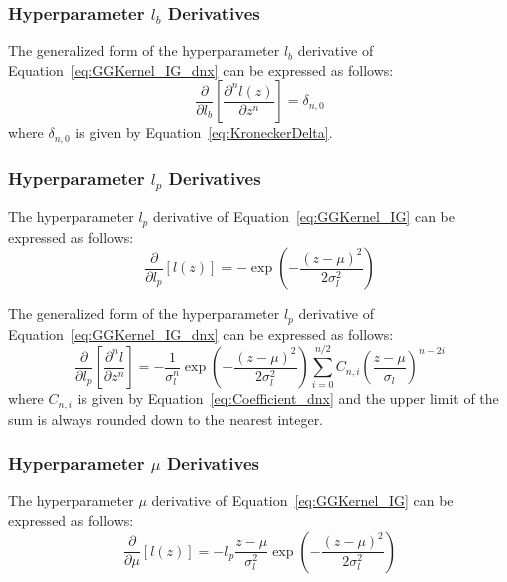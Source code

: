 \documentclass{article}
\begin{document}
\subsubsection{Hyperparameter $l_b$ Derivatives}
\label{subsubsec:GG_IGHypDer_lb}

The generalized form of the hyperparameter $l_b$ derivative of Equation~\eqref{eq:GGKernel_IG_dnx} can be expressed as follows:
\begin{equation}
\label{eq:GGKernel_IG_db_dnx}
	\frac{\partial}{\partial l_b} \left[\frac{\partial^n l\!\left(z\right)}{\partial z^n}\right] = \delta_{n,0}
\end{equation}
where $\delta_{n,0}$ is given by Equation~\eqref{eq:KroneckerDelta}.

\subsubsection{Hyperparameter $l_p$ Derivatives}
\label{subsubsec:GG_IGHypDer_lp}

The hyperparameter $l_p$ derivative of Equation~\eqref{eq:GGKernel_IG} can be expressed as follows:
\begin{equation}
\label{eq:GGKernel_IG_dp}
	\frac{\partial}{\partial l_p} \left[l\!\left(z\right)\right] = -\exp{\left(-\frac{\left(z - \mu\right)^2}{2 \sigma_l^2}\right)}
\end{equation}

The generalized form of the hyperparameter $l_p$ derivative of Equation~\eqref{eq:GGKernel_IG_dnx} can be expressed as follows:
\begin{equation}
\label{eq:GGKernel_IG_dp_dnx}
	\frac{\partial}{\partial l_p} \left[\frac{\partial^n l}{\partial z^n}\right] = - \frac{1}{\sigma_l^n} \exp{\left(-\frac{\left(z - \mu\right)^2}{2 \sigma_l^2}\right)} \sum_{i=0}^{n/2} C_{n,i} \left(\frac{z - \mu}{\sigma_l}\right)^{n-2i}
\end{equation}
where $C_{n,i}$ is given by Equation~\eqref{eq:Coefficient_dnx} and the upper limit of the sum is always rounded down to the nearest integer.

\subsubsection{Hyperparameter $\mu$ Derivatives}
\label{subsubsec:GG_IGHypeDer_m}

The hyperparameter $\mu$ derivative of Equation~\eqref{eq:GGKernel_IG} can be expressed as follows:
\begin{equation}
\label{eq:GGKernel_IG_dm}
	\frac{\partial}{\partial \mu}\!\left[l\!\left(z\right)\right] = -l_p \frac{z - \mu}{\sigma_l^2} \exp{\left(-\frac{\left(z - \mu\right)^2}{2 \sigma_l^2}\right)}
\end{equation}
\end{document}
